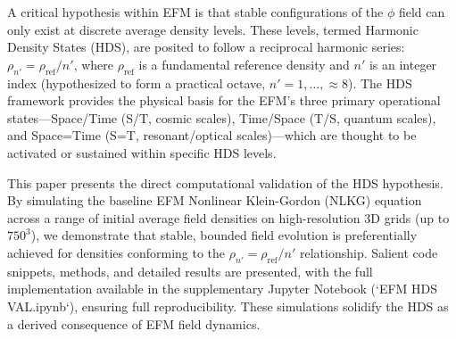 \documentclass[11pt]{article}
\begin{document}
A critical hypothesis within EFM is that stable configurations of the \(\phi\) field can only exist at discrete average density levels. These levels, termed Harmonic Density States (HDS), are posited to follow a reciprocal harmonic series: \(\rho_{n'} = \rho_{\text{ref}}/n'\), where \(\rho_{\text{ref}}\) is a fundamental reference density and \(n'\) is an integer index (hypothesized to form a practical octave, \(n' = 1, \ldots, \approx 8\)). The HDS framework provides the physical basis for the EFM's three primary operational states—Space/Time (S/T, cosmic scales), Time/Space (T/S, quantum scales), and Space=Time (S=T, resonant/optical scales)—which are thought to be activated or sustained within specific HDS levels.

This paper presents the direct computational validation of the HDS hypothesis. By simulating the baseline EFM Nonlinear Klein-Gordon (NLKG) equation across a range of initial average field densities on high-resolution 3D grids (up to \(750^3\)), we demonstrate that stable, bounded field evolution is preferentially achieved for densities conforming to the \(\rho_{n'} = \rho_{\text{ref}}/n'\) relationship. Salient code snippets, methods, and detailed results are presented, with the full implementation available in the supplementary Jupyter Notebook (`EFM HDS VAL.ipynb`), ensuring full reproducibility. These simulations solidify the HDS as a derived consequence of EFM field dynamics.
\end{document}
